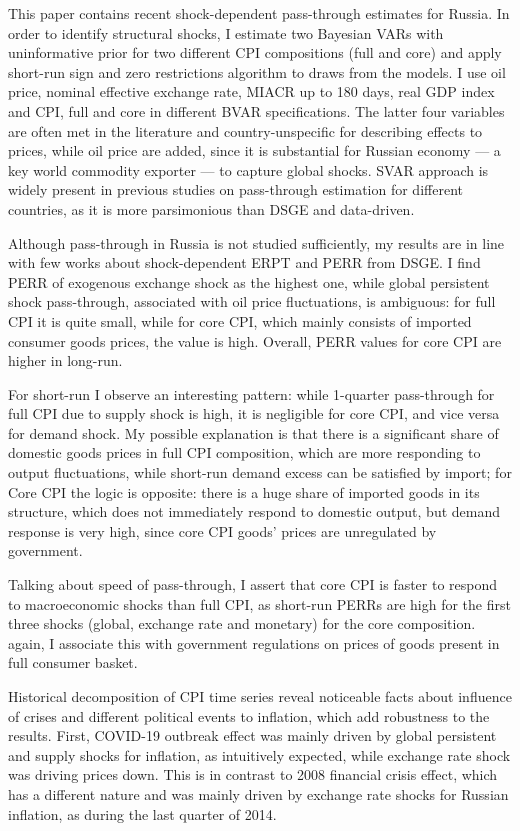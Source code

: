 \documentclass[12pt, a4paper]{extarticle}
\begin{document}
This paper contains recent shock-dependent pass-through estimates for Russia. In order to identify structural shocks, I estimate two Bayesian VARs with uninformative prior for two different CPI compositions (full and core) and apply short-run sign and zero restrictions algorithm to draws from the models. I use oil price, nominal effective exchange rate, MIACR up to 180 days, real GDP index and CPI, full and core in different BVAR specifications. The latter four variables are often met in the literature and country-unspecific for describing effects to prices, while oil price are added, since it is substantial for Russian economy --- a key world commodity exporter --- to capture global shocks. SVAR approach is widely present in previous studies on pass-through estimation for different countries, as it is more parsimonious than DSGE and data-driven.

Although pass-through in Russia is not studied sufficiently, my results are in line with few works about shock-dependent ERPT and PERR from DSGE. I find PERR of exogenous exchange shock as the highest one, while global persistent shock pass-through, associated with oil price fluctuations, is ambiguous: for full CPI it is quite small, while for core CPI, which mainly consists of imported consumer goods prices, the value is high. Overall, PERR values for core CPI are higher in long-run.

For short-run I observe an interesting pattern: while 1-quarter pass-through for full CPI due to supply shock is high, it is negligible for core CPI, and vice versa for demand shock. My possible explanation is that there is a significant share of domestic goods prices in full CPI composition, which are more responding to output fluctuations, while short-run demand excess can be satisfied by import; for Core CPI the logic is opposite: there is a huge share of imported goods in its structure, which does not immediately respond to domestic output, but demand response is very high, since core CPI goods' prices are unregulated by government.

Talking about speed of pass-through, I assert that core CPI is faster to respond to macroeconomic shocks than full CPI, as short-run PERRs are high for the first three shocks (global, exchange rate and monetary) for the core composition. again, I associate this with government regulations on prices of goods present in full consumer basket. 

Historical decomposition of CPI time series reveal noticeable facts about influence of crises and different political events to inflation, which add robustness to the results. First, COVID-19 outbreak effect was mainly driven by global persistent and supply shocks for inflation, as intuitively expected, while exchange rate shock was driving prices down. This is in contrast to 2008 financial crisis effect, which has a different nature and was mainly driven by exchange rate shocks for Russian inflation, as during the last quarter of 2014.
\end{document}
